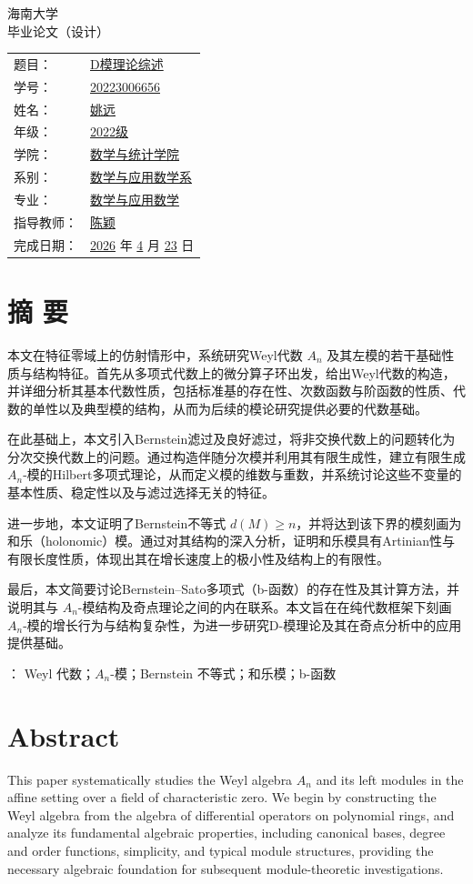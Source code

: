 \documentclass[12pt,a4paper]{ctexrep}   %
\newcommand{\centerchapter}{\ctexset{chapter={format=\centering\zihao{3}\bfseries}}}
\newcommand{\makecover}{
    \thispagestyle{empty}
    \begin{center}
        \vspace*{2cm}
        {\songti\zihao{1} 海南大学} \\[1.2cm]
        {\heiti\zihao{1} 毕业论文（设计）} \\[2.5cm]
        
        \vspace{6em}


        \zihao{3}\songti
        \renewcommand{\arraystretch}{1.2}
        \begin{tabular}{p{2.8cm}p{15cm}}
            题\quad 目：&\underline{D模理论综述\hspace{6.75em}} \\
            学\quad 号： &\underline{20223006656\hspace{7.4em}}\\
            姓\quad 名：  &\underline{姚远\hspace{11em}}\\
            年\quad 级：  &\underline{2022级\hspace{9.7em}}\\
            学\quad 院： &\underline{数学与统计学院\hspace{6em}}\\
            系\quad 别： &\underline{数学与应用数学系\hspace{5em}}\\
            专\quad 业：  &\underline{数学与应用数学\hspace{6em}}\\
            指导教师：  &\underline{陈颖\hspace{11em}}\\
            完成日期： & \underline{2026\hspace{2.5em}} 年 \underline{4\hspace{1.5em}} 月 \underline{23\hspace{1.5em}} 日 \\
        \end{tabular}
        
        \vfill
    \end{center}
    \clearpage
}
\begin{document}
\makecover
\pagestyle{fancy}
\setcounter{page}{1}

\newpage






\centerchapter


\chapter*{摘 \quad\quad 要}
\setlength{\parindent}{2em}
本文在特征零域上的仿射情形中，系统研究Weyl代数 $A_n$ 及其左模的若干基础性质与结构特征。首先从多项式代数上的微分算子环出发，给出Weyl代数的构造，并详细分析其基本代数性质，包括标准基的存在性、次数函数与阶函数的性质、代数的单性以及典型模的结构，从而为后续的模论研究提供必要的代数基础。

在此基础上，本文引入Bernstein滤过及良好滤过，将非交换代数上的问题转化为分次交换代数上的问题。通过构造伴随分次模并利用其有限生成性，建立有限生成 $A_n$-模的Hilbert多项式理论，从而定义模的维数与重数，并系统讨论这些不变量的基本性质、稳定性以及与滤过选择无关的特征。

进一步地，本文证明了Bernstein不等式 $d(M)\ge n$，并将达到该下界的模刻画为和乐（holonomic）模。通过对其结构的深入分析，证明和乐模具有Artinian性与有限长度性质，体现出其在增长速度上的极小性及结构上的有限性。

最后，本文简要讨论Bernstein--Sato多项式（b-函数）的存在性及其计算方法，并说明其与 $A_n$-模结构及奇点理论之间的内在联系。本文旨在在纯代数框架下刻画 $A_n$-模的增长行为与结构复杂性，为进一步研究D-模理论及其在奇点分析中的应用提供基础。




\vspace{1em}
：  Weyl 代数；$A_n$-模；Bernstein 不等式；和乐模；b-函数

\newpage
\chapter*{Abstract}
\setlength{\parindent}{2em}
This paper systematically studies the Weyl algebra $A_n$ and its left modules in the affine setting over a field of characteristic zero. We begin by constructing the Weyl algebra from the algebra of differential operators on polynomial rings, and analyze its fundamental algebraic properties, including canonical bases, degree and order functions, simplicity, and typical module structures, providing the necessary algebraic foundation for subsequent module-theoretic investigations.
\end{document}
